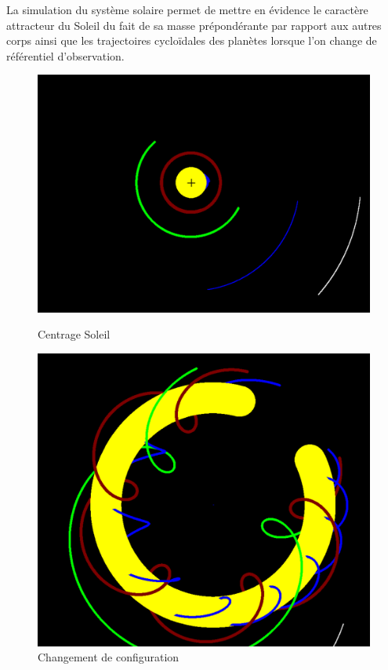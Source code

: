 \documentclass[a4paper, 12pt]{article}
\begin{document}
La simulation du système solaire permet de mettre en évidence le caractère attracteur du Soleil du fait de sa masse prépondérante par rapport aux autres corps ainsi que les trajectoires cycloïdales des planètes lorsque l'on change de référentiel d'observation.
	\begin{figure}[H]
    	\centering
    	\begin{minipage}{0.3\linewidth}
        	\centering
        	\includegraphics[width=\linewidth]{img/systemeSolaireCentrage1.png}
        	\caption{\label{fig:systsolaire1} Centrage Soleil}
    	\end{minipage}
    	\hspace{0.05\linewidth}  %
    	\begin{minipage}{0.27\linewidth}
        	\centering
        	\includegraphics[width=\linewidth]{img/systemesolaireCentrage2.png}
        	\caption{\label{fig:systsolaire2} Changement de configuration} 
    	\end{minipage}
	\end{figure} 
\end{document}
